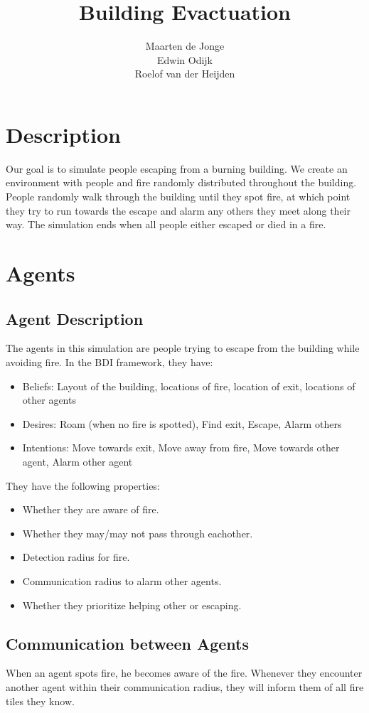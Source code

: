 \documentclass[a4paper]{article}
\title{Building Evactuation}
\author{Maarten de Jonge \\
        Edwin Odijk \\
        Roelof van der Heijden}
\begin{document}
\maketitle

\section{Description}
Our goal is to simulate people escaping from a burning building. We create an environment with people and fire randomly distributed throughout the building. People randomly walk through the building until they spot fire, at which point they try to run towards the escape and alarm any others they meet along their way. The simulation ends when all people either escaped or died in a fire.

\section{Agents}

\subsection{Agent Description}
The agents in this simulation are people trying to escape from the building while avoiding fire. In the BDI framework, they have:
\begin{itemize}
\item Beliefs: Layout of the building, locations of fire, location of exit, locations of other agents
\item Desires: Roam (when no fire is spotted), Find exit, Escape, Alarm others
\item Intentions: Move towards exit, Move away from fire, Move towards other agent, Alarm other agent
\end{itemize}
They have the following properties:
\begin{itemize}
\item Whether they are aware of fire.
\item Whether they may/may not pass through eachother.
\item Detection radius for fire.
\item Communication radius to alarm other agents.
\item Whether they prioritize helping other or escaping.
\end{itemize}

\subsection{Communication between Agents}
When an agent spots fire, he becomes aware of the fire. Whenever they encounter another agent within their communication radius, they will inform them of all fire tiles they know.
\end{document}
